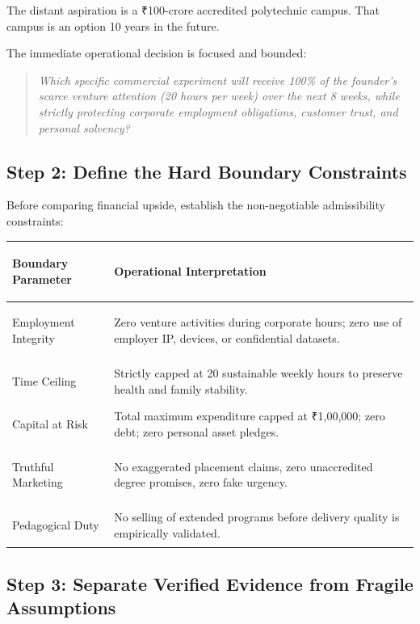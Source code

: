 The distant aspiration is a ₹100-crore accredited polytechnic campus. That campus is an option 10 years in the future.

The immediate operational decision is focused and bounded:
\begin{quote}
\itshape
Which specific commercial experiment will receive 100\% of the founder's scarce venture attention (20 hours per week) over the next 8 weeks, while strictly protecting corporate employment obligations, customer trust, and personal solvency?
\end{quote}

\subsection{Step 2: Define the Hard Boundary Constraints}

Before comparing financial upside, establish the non-negotiable admissibility constraints:

\begin{tcolorbox}[
  enhanced,
  colback=BayesSurface!60,
  colframe=BayesBorder,
  boxrule=0.5pt,
  arc=3pt,
  left=3pt,right=3pt,top=3pt,bottom=3pt,
  boxsep=1pt
]
\scriptsize
\begin{tabularx}{\linewidth}{>{\bfseries\raggedright\arraybackslash}p{2.3cm} X}
\toprule
\textbf{Boundary Parameter} & \textbf{Operational Interpretation} \\
\midrule
Employment Integrity & Zero venture activities during corporate hours; zero use of employer IP, devices, or confidential datasets. \\
\addlinespace[2pt]
Time Ceiling & Strictly capped at 20 sustainable weekly hours to preserve health and family stability. \\
\addlinespace[2pt]
Capital at Risk & Total maximum expenditure capped at ₹1,00,000; zero debt; zero personal asset pledges. \\
\addlinespace[2pt]
Truthful Marketing & No exaggerated placement claims, zero unaccredited degree promises, zero fake urgency. \\
\addlinespace[2pt]
Pedagogical Duty & No selling of extended programs before delivery quality is empirically validated. \\
\bottomrule
\end{tabularx}
\end{tcolorbox}

\subsection{Step 3: Separate Verified Evidence from Fragile Assumptions}

